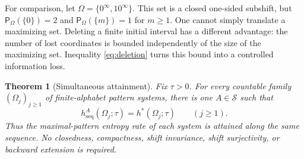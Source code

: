 \documentclass[11pt,reqno]{amsart}
\numberwithin{equation}{section}
\newtheorem{theorem}{Theorem}[section]
\theoremstyle{definition}
\newcommand{\Patt}{\mathsf P}
\newcommand{\hseq}{h_{\mathrm{seq}}}
\newcommand{\hpat}{h^{*}}
\begin{document}
For comparison, let $\Omega=\{0^\infty,10^\infty\}$. This set is a
closed one-sided subshift, but
$\Patt_\Omega(\{0\})=2$ and $\Patt_\Omega(\{m\})=1$ for $m\ge1$.
One cannot simply translate a maximizing set. Deleting a finite initial
interval has a different advantage: the number of lost coordinates is
bounded independently of the size of the maximizing set. Inequality
\eqref{eq:deletion} turns this bound into a controlled information loss.

\begin{theorem}[Simultaneous attainment]\label{thm:A}
Fix $\tau>0$.  For every countable family
$(\Omega_j)_{j\ge1}$ of finite-alphabet pattern systems, there is one
$A\in\mathscr S$ such that
\begin{equation}\label{eq:simultaneous-attainment}
 \hseq^A(\Omega_j;\tau)=\hpat(\Omega_j;\tau)
 \qquad(j\ge1).
\end{equation}
Thus the maximal-pattern entropy rate of each system is attained along the same
sequence.  No closedness, compactness, shift invariance, shift surjectivity, or
backward extension is required.
\end{theorem}
\end{document}
